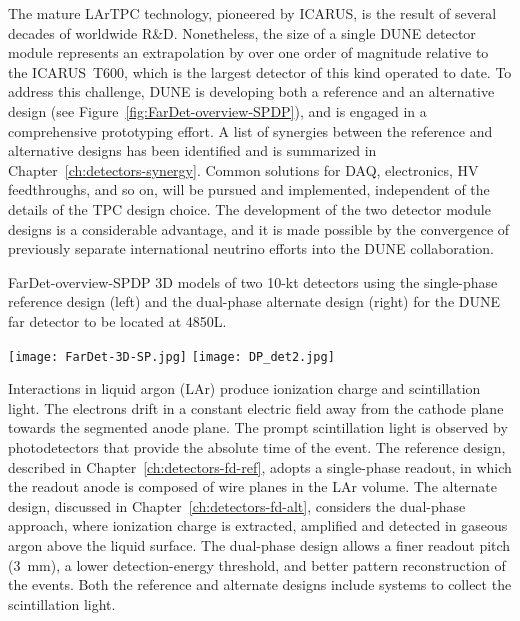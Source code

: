 The mature LArTPC technology, pioneered by ICARUS, is the result of
several decades of worldwide R\&D.  Nonetheless, the size of a single
 DUNE detector module represents an extrapolation by over
one order of magnitude relative to the ICARUS~T600, which is the
largest detector of this kind operated to date. To address this
challenge, DUNE is developing both a reference and an alternative
design (see Figure~\ref{fig:FarDet-overview-SPDP}), and is engaged in
a comprehensive prototyping effort.  A list of synergies between the
reference and alternative designs has been identified and is
summarized in Chapter~\ref{ch:detectors-synergy}. Common solutions for
DAQ, electronics, HV feedthroughs, and so on, will be pursued and
implemented, independent of the details of the TPC design choice. The
development of the two detector module designs is a considerable
advantage, and it is made possible by the convergence of previously
separate international neutrino efforts into the DUNE collaboration.
\begin{cdrfigure}{FarDet-overview-SPDP}
{3D models of two 10-kt detectors using the single-phase reference design (left) 
and the dual-phase alternate design (right) for the DUNE far detector to be 
located at 4850L.}
\centering
\begin{minipage}[b]{1.0\textwidth}
\begin{center}
\texttt{[image: FarDet-3D-SP.jpg]}
\texttt{[image: DP\_det2.jpg]}
\end{center}
\end{minipage}
\end{cdrfigure}

Interactions in liquid argon (LAr) produce ionization charge and
scintillation light.  The electrons drift in a constant electric field
away from the cathode plane towards the segmented anode plane.  The
prompt scintillation light is observed by photodetectors that provide
the absolute time of the event.  The reference design, described in
Chapter~\ref{ch:detectors-fd-ref}, adopts a single-phase readout, in
which the readout anode is composed of wire planes in the LAr volume.
The alternate design, discussed in Chapter~\ref{ch:detectors-fd-alt},
considers the dual-phase approach, where ionization charge is
extracted, amplified and detected in gaseous argon above the liquid
surface.  The dual-phase design allows a finer readout pitch (3~mm), a
lower detection-energy threshold, and better pattern reconstruction of
the events.  Both the reference and alternate designs include systems
to collect the scintillation light.


